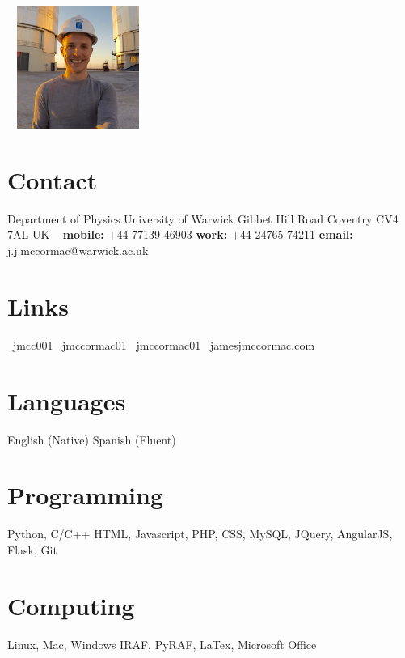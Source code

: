 \documentclass[print]{friggeri-cv} %
\begin{document}


\begin{aside} %
\vspace{0.35cm}~
\includegraphics[width=4.0cm]{CV_Photo.jpg}
~
\section{Contact}
Department of Physics
University of Warwick
Gibbet Hill Road
Coventry
CV4 7AL
UK
~
{\bf mobile:} 
+44 77139 46903
{\bf work:} 
+44 24765 74211
{\bf email:}
{\small j.j.mccormac@warwick.ac.uk}
~
\section{Links}
{\small \faLinkedin~jmcc001}
{\small \faSkype~jmccormac01}
{\small \faGithub~jmccormac01}
{\small \faGlobe~jamesjmccormac.com}
~
\section{Languages}
English (Native)
Spanish (Fluent)
\section{Programming}
Python, C/C++
HTML, Javascript, 
PHP, CSS, MySQL,  
JQuery, AngularJS,
Flask, Git
\section{Computing}
Linux, Mac, Windows
IRAF, PyRAF, LaTex,
Microsoft Office
\end{aside}

\end{document}
